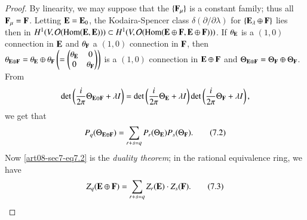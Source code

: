 \begin{proof}
By linearity, we may suppose that the $\{\mathbf{F}_{\mu}\}$ is a constant family; thus all $\mathbf{F}_{\mu}=\mathbf{F}$. Letting $\mathbf{E}=\mathbf{E}_{0}$, the Kodaira-Spencer class $\delta(\partial/\partial \lambda)$ for $\{\mathbf{E}_{\lambda}\oplus \mathbf{F}\}$ lies then in $H^{1}(V,\mathcal{O}(\operatorname{\mathrm{Hom}}(\mathbf{E},\mathbf{E})))\subset H^{1}(V,\mathcal{O}(\operatorname{\mathrm{Hom}}(\mathbf{E}\oplus \mathbf{F},\mathbf{E}\oplus \mathbf{F})))$. If $\theta_{\mathbf{E}}$ is a $(1,0)$ connection in $\mathbf{E}$ and $\theta_{\mathbf{F}}$ a $(1,0)$ connection in $\mathbf{F}$, then $\theta_{\mathbf{E}\oplus \mathbf{F}}=\theta_{\mathbf{E}}\oplus \theta_{\mathbf{F}}\left(=\left(\begin{matrix} \theta_{\mathbf{E}} & 0\\ 0 &\theta_{\mathbf{F}}\end{matrix}\right)\right)$ is a $(1,0)$ connection in $\mathbf{E}\oplus\mathbf{F}$ and $\Theta_{\mathbf{E}\oplus\mathbf{F}}=\Theta_{\mathbf{F}}\oplus\Theta_{\mathbf{F}}$. From
$$
\det \left(\dfrac{i}{2\pi}\Theta_{\mathbf{E}\oplus\mathbf{F}}+\lambda I\right)=\det \left(\dfrac{i}{2\pi}\Theta_{\mathbf{E}}+\lambda I\right)\det \left(\dfrac{i}{2\pi}\Theta_{\mathbf{F}}+\lambda I\right),
$$
we get that
\begin{equation*}
P_{q}(\Theta_{\mathbf{E}\oplus \mathbf{F}})=\sum\limits_{r+s=q}P_{r}(\Theta_{\mathbf{E}})P_{s}(\Theta_{\mathbf{F}}).\tag{7.2}\label{art08-sec7-eq7.2}
\end{equation*}
Now \eqref{art08-sec7-eq7.2} is the {\em duality theorem}; in the rational equivalence ring, we have 
\begin{equation*}
Z_{q}(\mathbf{E}\oplus \mathbf{F})=\sum\limits_{r+s=q}Z_{r}(\mathbf{E})\cdot Z_{s}(\mathbf{F}).\tag{7.3}\label{art08-sec7-eq7.3}
\end{equation*}


\end{proof}

